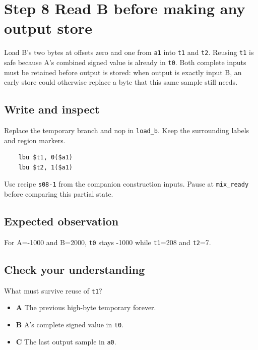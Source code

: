 \section{Step 8 Read B before making any output store}\label{pcm-s08}

Load B’s two bytes at offsets zero and one from \texttt{a1} into \texttt{t1} and \texttt{t2}. Reusing \texttt{t1} is safe because A’s combined signed value is already in \texttt{t0}. Both complete inputs must be retained before output is stored: when output is exactly input B, an early store could otherwise replace a byte that this same sample still needs.

\subsection{Write and inspect}
Replace the temporary branch and nop in \texttt{load\_b}. Keep the surrounding labels and region markers.

\begin{verbatim}
    lbu $t1, 0($a1)
    lbu $t2, 1($a1)
\end{verbatim}
Use recipe \texttt{s08-1} from the companion construction inputs. Pause at \texttt{mix\_ready} before comparing this partial state.

\subsection{Expected observation}
For A=-1000 and B=2000, \texttt{t0} stays -1000 while \texttt{t1}=208 and \texttt{t2}=7.

\subsection{Check your understanding}
What must survive reuse of \texttt{t1}?

\begin{itemize}
\item \textbf{A} The previous high-byte temporary forever.
\item \textbf{B} A’s complete signed value in \texttt{t0}.
\item \textbf{C} The last output sample in \texttt{a0}.
\end{itemize}
